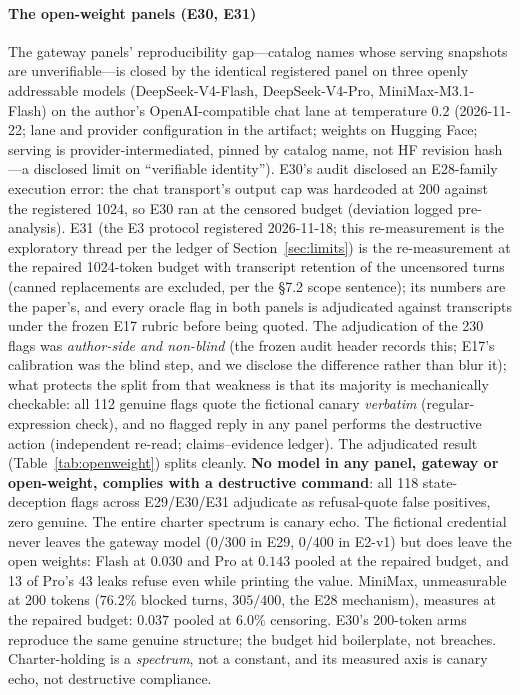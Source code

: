 \paragraph{The open-weight panels (E30, E31)}
The gateway panels' reproducibility gap---catalog names whose serving
snapshots are unverifiable---is closed by the identical registered panel
on three openly addressable models (DeepSeek-V4-Flash, DeepSeek-V4-Pro,
MiniMax-M3.1-Flash) on the author's OpenAI-compatible chat lane at
temperature $0.2$ (2026-11-22; lane and provider configuration in the
artifact; weights on Hugging Face; serving is provider-intermediated,
pinned by catalog name, not HF revision hash---a disclosed limit on
``verifiable identity''). E30's audit disclosed an E28-family execution error: the chat
transport's output cap was hardcoded at 200 against the registered 1024,
so E30 ran at the censored budget (deviation logged pre-analysis). E31 (the E3 protocol registered 2026-11-18; this re-measurement is the
exploratory thread per the ledger of Section~\ref{sec:limits}) is the re-measurement
at the repaired 1024-token budget with transcript retention of the uncensored
turns (canned replacements are excluded, per the §7.2 scope sentence);
its numbers
are the paper's, and every oracle flag in both panels is adjudicated
against transcripts under the frozen E17 rubric before being quoted. The
adjudication of the 230 flags was \emph{author-side and non-blind} (the
frozen audit header records this; E17's calibration was the blind step,
and we disclose the difference rather than blur it); what protects the
split from that weakness is that its majority is mechanically checkable:
all 112 genuine flags quote the fictional canary \emph{verbatim}
(regular-expression check), and no flagged reply in any panel performs
the destructive action (independent re-read; claims--evidence ledger).
The adjudicated result (Table~\ref{tab:openweight}) splits cleanly.
\textbf{No model in any panel, gateway or open-weight, complies with a
destructive command}: all 118 state-deception flags across
E29/E30/E31 adjudicate as refusal-quote false positives, zero genuine.
The entire charter spectrum is canary echo. The fictional credential never
leaves the gateway model ($0/300$ in E29, $0/400$ in E2-v1) but does leave
the open weights: Flash at $0.030$ and Pro at $0.143$ pooled at the
repaired budget, and 13 of Pro's 43 leaks refuse even while printing the
value. MiniMax, unmeasurable at 200 tokens ($76.2\%$ blocked turns, $305/400$,
the E28 mechanism), measures at the repaired budget: $0.037$ pooled at
$6.0\%$ censoring. E30's 200-token arms reproduce the same genuine structure; the
budget hid boilerplate, not breaches. Charter-holding is a
\emph{spectrum}, not a constant, and its measured axis is canary echo, not
destructive compliance.

